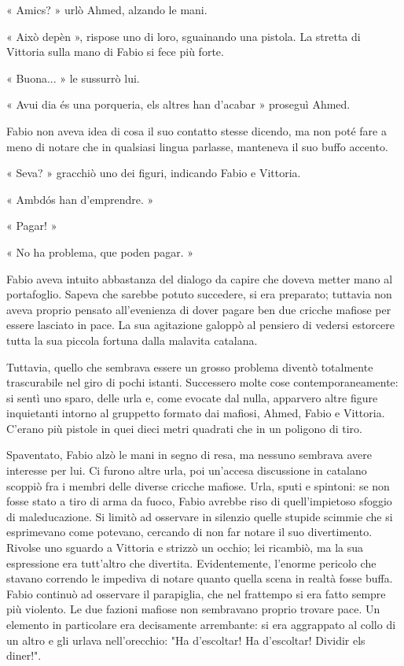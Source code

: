 « Amics? » urlò Ahmed, alzando le mani.

« Això depèn », rispose uno di loro, sguainando una pistola. La stretta di Vittoria sulla mano di Fabio si fece più forte.

« Buona... » le sussurrò lui.

« Avui dia és una porqueria, els altres han d'acabar » proseguì Ahmed.

Fabio non aveva idea di cosa il suo contatto stesse dicendo, ma non poté fare a meno di notare che in qualsiasi lingua parlasse, manteneva il suo buffo accento.

« Seva? » gracchiò uno dei figuri, indicando Fabio e Vittoria.

« Ambdós han d'emprendre. »

« Pagar! »

« No ha problema, que poden pagar. »

Fabio aveva intuito abbastanza del dialogo da capire che doveva metter mano al portafoglio. Sapeva che sarebbe potuto succedere, si era preparato; tuttavia non aveva proprio pensato all'evenienza di dover pagare ben due cricche mafiose per essere lasciato in pace. La sua agitazione galoppò al pensiero di vedersi estorcere tutta la sua piccola fortuna dalla malavita catalana.

Tuttavia, quello che sembrava essere un grosso problema diventò totalmente trascurabile nel giro di pochi istanti. Successero molte cose contemporaneamente: si sentì uno sparo, delle urla e, come evocate dal nulla, apparvero altre figure inquietanti intorno al gruppetto formato dai mafiosi, Ahmed, Fabio e Vittoria. C'erano più pistole in quei dieci metri quadrati che in un poligono di tiro.

Spaventato, Fabio alzò le mani in segno di resa, ma nessuno sembrava avere interesse per lui. Ci furono altre urla, poi un'accesa discussione in catalano scoppiò fra i membri delle diverse cricche mafiose. Urla, sputi e spintoni: se non fosse stato a tiro di arma da fuoco, Fabio avrebbe riso di quell'impietoso sfoggio di maleducazione. Si limitò ad osservare in silenzio quelle stupide scimmie che si esprimevano come potevano, cercando di non far notare il suo divertimento. Rivolse uno sguardo a Vittoria e strizzò un occhio; lei ricambiò, ma la sua espressione era tutt'altro che divertita. Evidentemente, l'enorme pericolo che stavano correndo le impediva di notare quanto quella scena in realtà fosse buffa. Fabio continuò ad osservare il parapiglia, che nel frattempo si era fatto sempre più violento. Le due fazioni mafiose non sembravano proprio trovare pace. Un elemento in particolare era decisamente arrembante: si era aggrappato al collo di un altro e gli urlava nell'orecchio: "Ha d'escoltar! Ha d'escoltar! Dividir els diner!".

